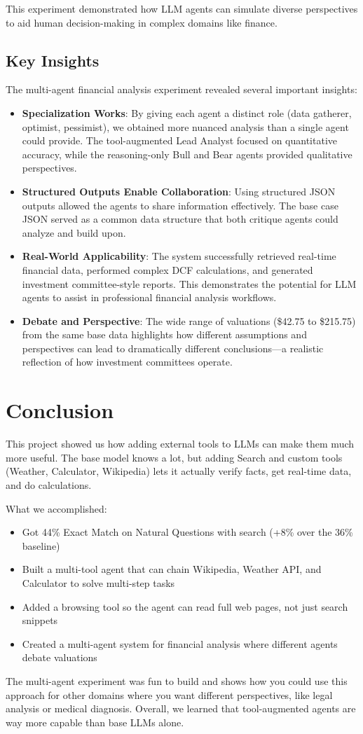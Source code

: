 \documentclass{article}
\begin{document}
This experiment demonstrated how LLM agents can simulate diverse perspectives to aid human decision-making in complex domains like finance.

\subsection{Key Insights}

The multi-agent financial analysis experiment revealed several important insights:

\begin{itemize}
    \item \textbf{Specialization Works}: By giving each agent a distinct role (data gatherer, optimist, pessimist), we obtained more nuanced analysis than a single agent could provide. The tool-augmented Lead Analyst focused on quantitative accuracy, while the reasoning-only Bull and Bear agents provided qualitative perspectives.
    \item \textbf{Structured Outputs Enable Collaboration}: Using structured JSON outputs allowed the agents to share information effectively. The base case JSON served as a common data structure that both critique agents could analyze and build upon.
    \item \textbf{Real-World Applicability}: The system successfully retrieved real-time financial data, performed complex DCF calculations, and generated investment committee-style reports. This demonstrates the potential for LLM agents to assist in professional financial analysis workflows.
    \item \textbf{Debate and Perspective}: The wide range of valuations (\$42.75 to \$215.75) from the same base data highlights how different assumptions and perspectives can lead to dramatically different conclusions—a realistic reflection of how investment committees operate.
\end{itemize}

\section{Conclusion}

This project showed us how adding external tools to LLMs can make them much more useful. The base model knows a lot, but adding Search and custom tools (Weather, Calculator, Wikipedia) lets it actually verify facts, get real-time data, and do calculations.

What we accomplished:
\begin{itemize}
    \item Got 44\% Exact Match on Natural Questions with search (+8\% over the 36\% baseline)
    \item Built a multi-tool agent that can chain Wikipedia, Weather API, and Calculator to solve multi-step tasks
    \item Added a browsing tool so the agent can read full web pages, not just search snippets
    \item Created a multi-agent system for financial analysis where different agents debate valuations
\end{itemize}

The multi-agent experiment was fun to build and shows how you could use this approach for other domains where you want different perspectives, like legal analysis or medical diagnosis. Overall, we learned that tool-augmented agents are way more capable than base LLMs alone.
\end{document}
